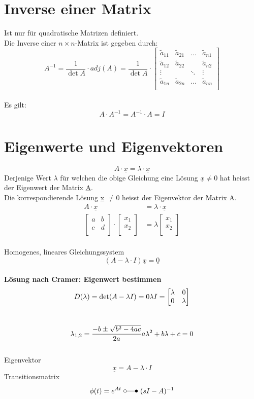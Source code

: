 \section{Inverse einer Matrix}
Ist nur für quadratische Matrizen definiert.\\
Die Inverse einer $n \times n$-Matrix ist gegeben durch:
\[
	A^{-1} = \frac{1}{\det{A}} \cdot adj(A) = \frac{1}{\det{A}} \cdot
	\begin{bmatrix}
		\tilde{a}_{11} & \tilde{a}_{21} & \ldots & \tilde{a}_{n1}\\
		\tilde{a}_{12} & \tilde{a}_{22} & 		 & \tilde{a}_{n2}\\
		\vdots		   &				& \ddots & \vdots \\
		\tilde{a}_{1n} & \tilde{a}_{2n} & \ldots & \tilde{a}_{nn}\\
	\end{bmatrix}
\]
\\
Es gilt:
\[
	A \cdot A^{-1} = A^{-1} \cdot A = I
\]

\section{Eigenwerte und Eigenvektoren}
\[
	A \cdot \underline{x} = \lambda \cdot \underline{x}
\]
Derjenige Wert $\lambda$ für welchen die obige Gleichung eine Lösung $\underline{x}\neq 0$ hat heisst der Eigenwert der Matrix \underline{A}. 
\\Die korrespondierende Lösung \underline{x} $\neq 0$ heisst der Eigenvektor der Matrix A.
\\
\[\begin{aligned}
	A \cdot \underline{x }&=\lambda \cdot \underline{x}\\
		\begin{bmatrix}
			a & b  \\
			c & d  \\
		\end{bmatrix}
		\cdot	
		\begin{bmatrix}
				x_1 \\
				x_2 \\
		\end{bmatrix}
		&=
		\lambda
		\begin{bmatrix}
				x_1 \\
				x_2 \\
		\end{bmatrix}
\end{aligned}
\]
\\
Homogenes, lineares Gleichungssystem
\[
	(A-\lambda\cdot I) \underline{x} = \underline{0}
\]
\\
\textbf{Lösung nach Cramer: Eigenwert bestimmen}
\[
		D(\lambda)=\det(A-\lambda I)= 0	\\	\lambda I = \begin{bmatrix}
			\lambda & 0  \\
			0 & \lambda  \\
		\end{bmatrix}
\]
\\
\[
		\lambda_{1,2}=\frac{-b\pm \sqrt{b^2-4ac}}{2a}	\\	a	\lambda^2+b	\lambda+c=0
\]
\\
Eigenvektor
\[
		\underline{x}= A - \lambda \cdot I 
\]
Transitionsmatrix
\[
	\phi(t)= e^{At} \ \laplace\ (sI-A)^{-1}
\]